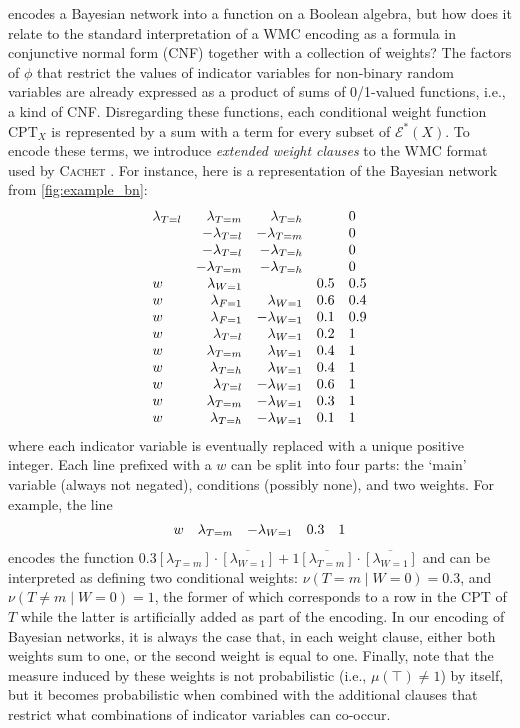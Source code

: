  encodes a Bayesian network into a function on a Boolean
algebra, but how does it relate to the standard interpretation of a WMC encoding
as a formula in conjunctive normal form (CNF) together with a collection of
weights? The factors of $\phi$ that restrict the values of indicator variables
for non-binary random variables are already expressed as a product of sums of
0/1-valued functions, i.e., a kind of CNF\@. Disregarding these functions, each
conditional weight function $\mathrm{CPT}_X$ is represented by a sum with a term
for every subset of $\mathcal{E}^*(X)$. To encode these terms, we introduce
\emph{extended weight clauses} to the WMC format used by \textsc{Cachet}
\citep{DBLP:conf/sat/SangBBKP04}. For instance, here is a representation of the
Bayesian network from \cref{fig:example_bn}:
\[
  \begin{array}{lrrll}
    \lambda\sb{T=l} &\lambda\sb{T=m} &\lambda\sb{T=h} & &0 \\
                    &-\lambda\sb{T=l} &-\lambda\sb{T=m} & &0 \\
                    &-\lambda\sb{T=l} &-\lambda\sb{T=h} & &0 \\
                    &-\lambda\sb{T=m} &-\lambda\sb{T=h} & &0 \\
    w &\lambda\sb{W=1} & &0.5 &0.5 \\
    w &\lambda\sb{F=1} &\lambda\sb{W=1} &0.6 &0.4 \\
    w &\lambda\sb{F=1} &-\lambda\sb{W=1} &0.1 &0.9 \\
    w &\lambda\sb{T=l} &\lambda\sb{W=1} &0.2 &1 \\
    w &\lambda\sb{T=m} &\lambda\sb{W=1} &0.4 &1 \\
    w &\lambda\sb{T=h} &\lambda\sb{W=1} &0.4 &1 \\
    w &\lambda\sb{T=l} &-\lambda\sb{W=1} &0.6 &1 \\
    w &\lambda\sb{T=m} &-\lambda\sb{W=1} &0.3 &1 \\
    w &\lambda\sb{T=h} &-\lambda\sb{W=1} &0.1 &1
  \end{array}
\]
where each indicator variable is eventually replaced with a unique positive
integer. Each line prefixed with a $w$ can be split into four parts: the `main'
variable (always not negated), conditions (possibly none), and two weights. For
example, the line
\[
  \begin{array}{lrrll}
    w &\lambda\sb{T=m} &-\lambda\sb{W=1} &0.3 &1
  \end{array}
\]
encodes the function $0.3[\lambda_{T=m}] \cdot \overline{[\lambda_{W=1}]} +
1\overline{[\lambda_{T=m}]} \cdot \overline{[\lambda_{W=1}]}$ and can be
interpreted as defining two conditional weights: $\nu(T = m \mid W = 0) = 0.3$,
and $\nu(T \ne m \mid W = 0) = 1$, the former of which corresponds to a row in
the CPT of $T$ while the latter is artificially added as part of the encoding.
In our encoding of Bayesian networks, it is always the case that, in each weight
clause, either both weights sum to one, or the second weight is equal to one.
Finally, note that the measure induced by these weights is not probabilistic
(i.e., $\mu(\top) \ne 1$) by itself, but it becomes probabilistic when combined
with the additional clauses that restrict what combinations of indicator
variables can co-occur.


